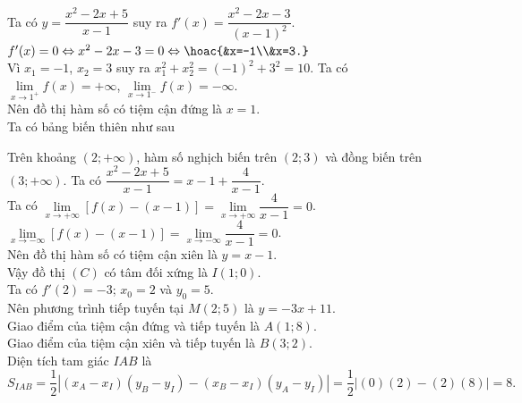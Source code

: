 \begin{ex}
{\begin{itemchoice}
			\itemch 
			Ta có $y = \dfrac{x^2 - 2x + 5}{x - 1}$ suy ra $f'(x) =  \dfrac{x^2 - 2x - 3}{\left(x-1\right)^2}$.\\
			$f'(x) = 0\Leftrightarrow x^2 - 2x - 3 = 0\Leftrightarrow\hoac{&x=-1\\&x=3.}$\\
			Vì $x_1 = -1$, $x_2 = 3$ suy ra  $x_1^2 + x_2^2 =  \left(-1\right)^2 + 3^2 = 10$.
			\itemch 
			Ta có $\lim\limits_{x\rightarrow 1^+}f(x)=+\infty$, $\lim\limits_{x\rightarrow 1^-}f(x)=-\infty$.\\
			Nên đồ thị hàm số có tiệm cận đứng là $x=1$.\\
			Ta có bảng biến thiên như sau
			\begin{center}
			\end{center}
			Trên khoảng $(2;+\infty)$, hàm số nghịch biến trên $(2;3)$ và đồng biến trên $(3;+\infty)$.
			\itemch 
			Ta có $\dfrac{x^2 - 2x + 5}{x - 1}=x-1+\dfrac{4}{x - 1}$.\\
			Ta có $\lim\limits_{x\rightarrow +\infty}\left[f(x)-(x-1)\right]=\lim\limits_{x\rightarrow +\infty}\dfrac{4}{x-1}=0$.\\
			$\lim\limits_{x\rightarrow -\infty}\left[f(x)-(x-1)\right]=\lim\limits_{x\rightarrow -\infty}\dfrac{4}{x-1}=0$.\\
			Nên đồ thị hàm số có tiệm cận xiên là $y=x-1$.\\
			Vậy đồ thị $\left(C\right)$ có tâm đối xứng là $I(1;0)$.\\
			Ta có $f'(2)=-3$; $x_0=2$ và $y_0=5$.\\
			Nên phương trình tiếp tuyến tại $M(2;5)$ là $y = -3x + 11$.\\
			Giao điểm của tiệm cận đứng và tiếp tuyến là $A(1;8)$.\\
			Giao điểm của tiệm cận xiên và tiếp tuyến là $B(3;2)$.\\
			Diện tích tam giác $IAB$ là $$S_{IAB} = \dfrac{1}{2} \left|(x_A-x_I)(y_B-y_I) - (x_B-x_I)(y_A-y_I)\right| = \dfrac{1}{2} \left|(0)(2) - (2)(8)\right| = 8.$$
		\end{itemchoice}
	}
\end{ex}

